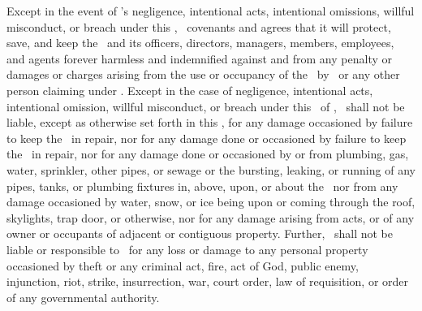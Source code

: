 Except in the event of \lessor’s negligence, intentional acts, intentional omissions, willful misconduct, or breach under this \amendmentTitle, \lessee\ covenants and agrees that it will protect, save, and keep the \lessor\ and its officers, directors, managers, members, employees, and agents forever harmless and indemnified against and from any penalty or damages or charges arising from the use or occupancy of the \property\ by \lessee\ or any other person claiming under \lessee. Except in the case of negligence, intentional acts, intentional omission, willful misconduct, or breach under this \amendmentTitle\ of \lessor, \lessor\ shall not be liable, except as otherwise set forth in this \amendmentTitle, for any damage occasioned by failure to keep the \property\ in repair, nor for any damage done or occasioned by failure to keep the \property\ in repair, nor for any damage done or occasioned by or from plumbing, gas, water, sprinkler, other pipes, or sewage or the bursting, leaking, or running of any pipes, tanks, or plumbing fixtures in, above, upon, or about the \property\ nor from any damage occasioned by water, snow, or ice being upon or coming through the roof, skylights, trap door, or otherwise, nor for any damage arising from acts, or of any owner or occupants of adjacent or contiguous property. Further, \lessor\ shall not be liable or responsible to \lessee\ for any loss or damage to any personal property occasioned by theft or any criminal act, fire, act of God, public enemy, injunction, riot, strike, insurrection, war, court order, law of requisition, or order of any governmental authority.
